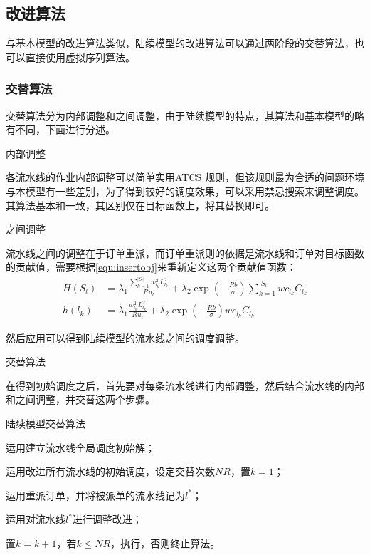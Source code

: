 \subsection{改进算法}
与基本模型的改进算法类似，陆续模型的改进算法可以通过两阶段的交替算法，也可以直接使用虚拟序列算法。
\subsubsection{交替算法}
交替算法分为内部调整和之间调整，由于陆续模型的特点，其算法和基本模型的略有不同，下面进行分述。
\begin{asparaenum}
\item 内部调整

各流水线的作业内部调整可以简单实用ATCS 规则，但该规则最为合适的问题环境与本模型有一些差别，为了得到较好的调度效果，可以采用禁忌搜索来调整调度。其算法基本和一致，其区别仅在目标函数上，将其替换即可。

\item 之间调整

流水线之间的调整在于订单重派，而订单重派则的依据是流水线和订单对目标函数的贡献值，需要根据\eqref{equ:insertobj}来重新定义这两个贡献值函数：
\begin{align}
H(S_l) &= \lambda_1\frac{\sum_{k=1}^{|S_l|}w_{l_k}^2L_{l_k}^2}{Ru_l} + \lambda_2 \exp\left(-\frac{Rb}{\sigma}\right)\sum_{k=1}^{|S_l|}wc_{l_k}C_{l_k}\label{equ:lineinsertfunct}\\
h(l_k) &= \lambda_1\frac{w_{l_k}^2L_{l_k}^2}{Ru_l} + \lambda_2 \exp\left(-\frac{Rb}{\sigma}\right)wc_{l_k}C_{l_k}
\label{equ:iteminsertfunct}
\end{align}

然后应用可以得到陆续模型的流水线之间的调度调整。
\item 交替算法
\end{asparaenum}

在得到初始调度之后，首先要对每条流水线进行内部调整，然后结合流水线的内部和之间调整，并交替这两个步骤。
\begin{algori}
陆续模型交替算法\label{alg:inturncontinue}
\begin{asparaenum}
\renewcommand{\labelenumi}{\bf Step\theenumi~}
\item 运用建立流水线全局调度初始解；
\item 运用改进所有流水线的初始调度，设定交替次数$NR$，置$k = 1$；
\item 运用重派订单，并将被派单的流水线记为$l^*$；
\item 运用对流水线$l^*$进行调整改进；
\item 置$k = k+1$，若$k\le NR$，执行，否则终止算法。
\end{asparaenum}
\end{algori}


